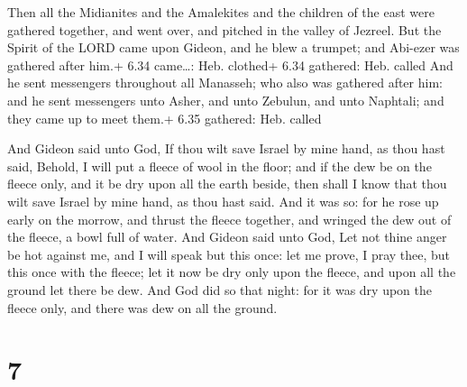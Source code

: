 Then all the Midianites and the Amalekites and the
children of the east were gathered together, and went over, and pitched
in the valley of Jezreel.  But the Spirit of the LORD came
upon Gideon, and he blew a trumpet; and Abi-ezer was gathered after
him.+ 6.34 came\ldots: Heb. clothed+ 6.34 gathered: Heb. called
 And he sent messengers throughout all Manasseh; who also
was gathered after him: and he sent messengers unto Asher, and unto
Zebulun, and unto Naphtali; and they came up to meet them.+ 6.35
gathered: Heb. called

 And Gideon said unto God, If thou wilt save Israel by
mine hand, as thou hast said,  Behold, I will put a fleece
of wool in the floor; and if the dew be on the fleece only, and it be
dry upon all the earth beside, then shall I know that thou wilt save
Israel by mine hand, as thou hast said.  And it was so: for
he rose up early on the morrow, and thrust the fleece together, and
wringed the dew out of the fleece, a bowl full of water. 
And Gideon said unto God, Let not thine anger be hot against me, and I
will speak but this once: let me prove, I pray thee, but this once with
the fleece; let it now be dry only upon the fleece, and upon all the
ground let there be dew.  And God did so that night: for it
was dry upon the fleece only, and there was dew on all the ground.

\hypertarget{section-6}{%
\section{7}\label{section-6}}

